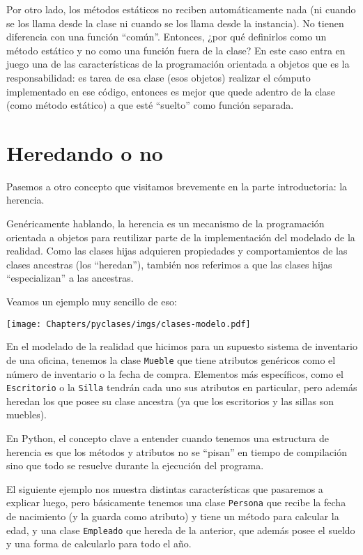 Por otro lado, los métodos estáticos no reciben automáticamente nada (ni cuando se los llama desde la clase ni cuando se los llama desde la instancia). No tienen diferencia con una función ``común''. Entonces, ¿por qué definirlos como un método estático y no como una función fuera de la clase? En este caso entra en juego una de las características de la programación orientada a objetos que es la responsabilidad: es tarea de esa clase (esos objetos) realizar el cómputo implementado en ese código, entonces es mejor que quede adentro de la clase (como método estático) a que esté ``suelto'' como función separada.

        
\section{Heredando o no}

Pasemos a otro concepto que visitamos brevemente en la parte introductoria: la herencia. 

Genéricamente hablando, la herencia es un mecanismo de la programación orientada a objetos para reutilizar parte de la implementación del modelado de la realidad. Como las clases hijas adquieren propiedades y comportamientos de las clases ancestras (los ``heredan''), también nos referimos a que las clases hijas ``especializan'' a las ancestras.

Veamos un ejemplo muy sencillo de eso:

\begin{center}
    \texttt{[image: Chapters/pyclases/imgs/clases-modelo.pdf]}
\end{center}

En el modelado de la realidad que hicimos para un supuesto sistema de inventario de una oficina, tenemos la clase \texttt{Mueble} que tiene atributos genéricos como el número de inventario o la fecha de compra. Elementos más específicos, como el \texttt{Escritorio} o la \texttt{Silla} tendrán cada uno sus atributos en particular, pero además heredan los que posee su clase ancestra (ya que los escritorios y las sillas son muebles).

En Python, el concepto clave a entender cuando tenemos una estructura de herencia es que los métodos y atributos no se ``pisan'' en tiempo de compilación sino que todo se resuelve durante la ejecución del programa.

El siguiente ejemplo nos muestra distintas características que pasaremos a explicar luego, pero básicamente tenemos una clase \texttt{Persona} que recibe la fecha de nacimiento (y la guarda como atributo) y tiene un método para calcular la edad, y una clase \texttt{Empleado} que hereda de la anterior, que además posee el sueldo y una forma de calcularlo para todo el año.

